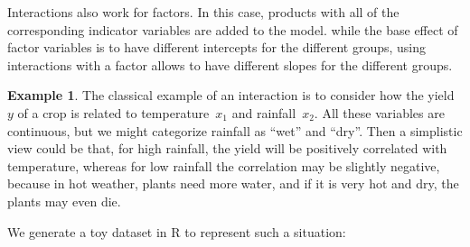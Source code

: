 \documentclass[
  a4paper,
]{article}
\newenvironment{Shaded}{\begin{snugshade}}{\end{snugshade}}
\newcommand{\AttributeTok}[1]{\textcolor[rgb]{0.77,0.63,0.00}{#1}}
\newcommand{\DecValTok}[1]{\textcolor[rgb]{0.00,0.00,0.81}{#1}}
\newcommand{\FunctionTok}[1]{\textcolor[rgb]{0.00,0.00,0.00}{#1}}
\newcommand{\NormalTok}[1]{#1}
\newcommand{\OtherTok}[1]{\textcolor[rgb]{0.56,0.35,0.01}{#1}}
\newcommand{\SpecialCharTok}[1]{\textcolor[rgb]{0.00,0.00,0.00}{#1}}
\newcommand{\StringTok}[1]{\textcolor[rgb]{0.31,0.60,0.02}{#1}}
\theoremstyle{definition}
\theoremstyle{definition}
\newtheorem{example}{Example}[section]
\theoremstyle{definition}
\theoremstyle{definition}
\theoremstyle{remark}
\begin{document}
Interactions also work for factors. In this case, products with all of
the corresponding indicator variables are added to the model. while
the base effect of factor variables is to have different intercepts for
the different groups, using interactions with a factor allows to have
different slopes for the different groups.

\begin{example}
The classical example of an interaction is to consider how the
yield~\(y\) of a crop is related to temperature~\(x_1\) and rainfall~\(x_2\).
All these variables are continuous, but we might categorize rainfall as ``wet''
and ``dry''. Then a simplistic view could be that, for high rainfall, the yield
will be positively correlated with temperature, whereas for low rainfall the
correlation may be slightly negative, because in hot weather, plants need more
water, and if it is very hot and dry, the plants may even die.

We generate a toy dataset in R to represent such a situation:

\begin{Shaded}
\end{Shaded}


\end{example}
\end{document}
